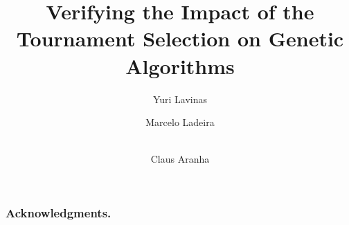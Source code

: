 \documentclass{article}
\begin{document}
\title{Verifying the Impact of the Tournament Selection on Genetic Algorithms}

\author{
  Yuri Lavinas \and
  Marcelo Ladeira \and \\ 
  Claus Aranha
}


\begin{abstract}

\end{abstract}


 






\subsubsection*{Acknowledgments.} 



\end{document}
